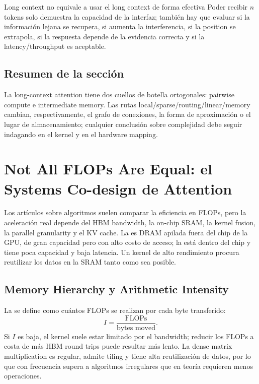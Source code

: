 \documentclass[a4paper]{article}
\begin{document}
\begin{importantbox}{Long context no equivale a usar el long context de forma efectiva}
Poder recibir $n$ tokens solo demuestra la capacidad de la interfaz; también hay que evaluar si la información lejana se recupera, si aumenta la interferencia, si la position se extrapola, si la respuesta depende de la evidencia correcta y si la latency/throughput es aceptable.
\end{importantbox}

\subsection{Resumen de la sección}

La long-context attention tiene dos cuellos de botella ortogonales: pairwise compute e intermediate memory. Las rutas local/sparse/routing/linear/memory cambian, respectivamente, el grafo de conexiones, la forma de aproximación o el lugar de almacenamiento; cualquier conclusión sobre complejidad debe seguir indagando en el kernel y en el hardware mapping.
\section{Not All FLOPs Are Equal: el Systems Co-design de Attention}

Los artículos sobre algoritmos suelen comparar la eficiencia en FLOPs, pero la aceleración real depende del HBM bandwidth, la on-chip SRAM, la kernel fusion, la parallel granularity y el KV cache. La  es DRAM apilada fuera del chip de la GPU, de gran capacidad pero con alto costo de acceso; la  está dentro del chip y tiene poca capacidad y baja latencia. Un kernel de alto rendimiento procura reutilizar los datos en la SRAM tanto como sea posible.

\subsection{Memory Hierarchy y Arithmetic Intensity}

La  se define como cuántos FLOPs se realizan por cada byte transferido:
\[
I=\frac{\text{FLOPs}}{\text{bytes moved}}.
\]
Si $I$ es baja, el kernel suele estar limitado por el bandwidth; reducir los FLOPs a costa de más HBM round trips puede resultar más lento. La dense matrix multiplication es regular, admite tiling y tiene alta reutilización de datos, por lo que con frecuencia supera a algoritmos irregulares que en teoría requieren menos operaciones.
\end{document}
